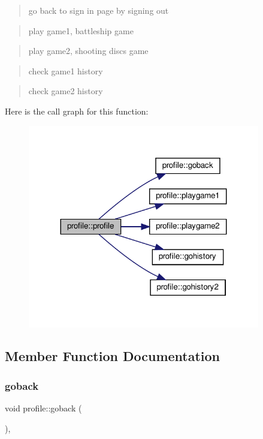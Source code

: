 \begin{quote}
go back to sign in page by signing out \end{quote}


\begin{quote}
play game1, battleship game \end{quote}


\begin{quote}
play game2, shooting discs game \end{quote}


\begin{quote}
check game1 history \end{quote}


\begin{quote}
check game2 history \end{quote}
Here is the call graph for this function\+:
\nopagebreak
\begin{figure}[H]
\begin{center}
\leavevmode
\includegraphics[width=287pt]{classprofile_a345e4de8245d251526e2e908deb323e0_cgraph}
\end{center}
\end{figure}


\subsection{Member Function Documentation}
\mbox{\label{classprofile_a0ba746f5f77f499dfc9ef25d0a6e88e2}} 
\subsubsection{\texorpdfstring{goback}{goback}}
{\footnotesize\ttfamily void profile\+::goback (\begin{DoxyParamCaption}{ }\end{DoxyParamCaption})\hspace{0.3cm}{\ttfamily [private]}, {\ttfamily [slot]}}



